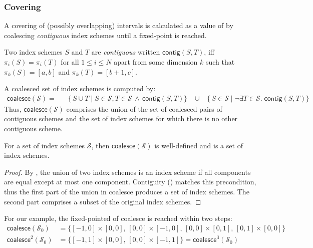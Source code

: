 \subsubsection{Covering}
A covering of (possibly overlapping) intervals is calculated as a
value of  by coalescing \emph{contiguous} index schemes
until a fixed-point is reached.

\newcommand{\contig}[2]{\mathsf{contig}(#1, #2)}
\begin{defn}[Contiguity]
  \label{def:contiguity}
  Two index schemes $S$ and $T$ are \emph{contiguous} written
  $\contig{S}{T}$, iff $\pi_i(S) = \pi_i(T)$ for all $1 \leq i \leq N$
  apart from some dimension $k$ such that $\pi_k(S) = [a, b]$ and
  $\pi_k(T) = [b+1, c]$.
\end{defn}
%
A coalesced set of index schemes is computed by:%
%
\begin{align*}
  \mathsf{coalesce}(\mathcal{S}) = \; & \;\;
  \{\,S \cup T \mid S \in \mathcal{S}, T \in \mathcal{S} \, \wedge \,
                                        \contig{S}{T} \}
  \;\;\; \cup \;\;\;
  \{\,S \in \mathcal{S} \mid \neg \exists T \in \mathcal{S} . \; \contig{S}{T}\}
\end{align*}
%
Thus, $\mathsf{coalesce}(\mathcal{S})$
comprises the union of the set of coalesced pairs of contiguous
schemes and the set of index schemes for which there is no other
contiguous scheme.
%
\begin{lemma}[Closure]
  For a set of index schemes $\mathcal{S}$, then
  $\mathsf{coalesce}(\mathcal{S})$ is well-defined and is a set of
  index schemes.
\end{lemma}
\begin{proof}
  By , the union of two index schemes is an
  index scheme if all components are equal except at most one
  component. Contiguity () matches
  this precondition, thus the first part of the union in
  \textsf{coalesce} produces a set of index schemes. The second part
  comprises a subset of the original index schemes.
\end{proof}
%
For our example, the fixed-pointed of \textsf{coalesce} is reached within two steps:
%
\begin{align*}
  \textsf{coalesce}(\mathcal{S}_0) & =
  \{[-1,0] \times [0,0],\,[0,0] \times [-1, 0],\,[0,0] \times
    [0,1],\,[0,1] \times [0,0]\} \\
  \textsf{coalesce}^2(\mathcal{S}_0) & =
  \{[-1, 1] \times [0, 0],\,[0, 0] \times [-1, 1]\} = \textsf{coalesce}^3(\mathcal{S}_0)
\end{align*}
%

